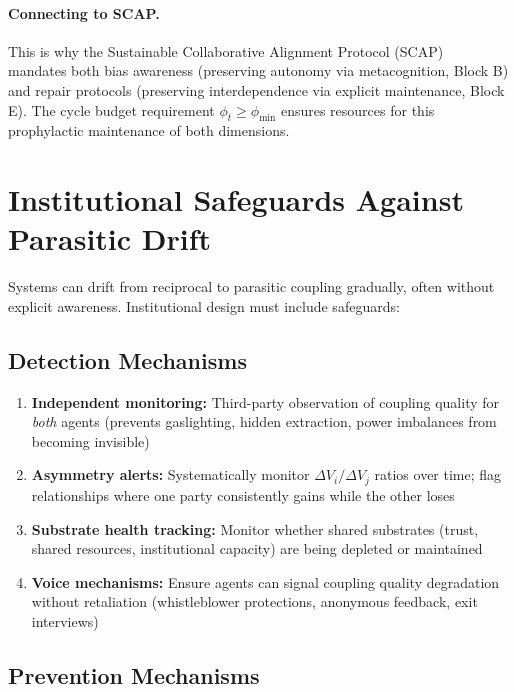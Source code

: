 \documentclass[11pt,a4paper]{article}
\begin{document}
\paragraph{Connecting to SCAP.} This is why the Sustainable Collaborative Alignment Protocol (SCAP)~\cite{scap} mandates both bias awareness (preserving autonomy via metacognition, Block B) and repair protocols (preserving interdependence via explicit maintenance, Block E). The cycle budget requirement $\phi_t \geq \phi_{\min}$ ensures resources for this prophylactic maintenance of both dimensions.

\section{Institutional Safeguards Against Parasitic Drift}

Systems can drift from reciprocal to parasitic coupling gradually, often without explicit awareness. Institutional design must include safeguards:

\subsection{Detection Mechanisms}

\begin{enumerate}
    \item \textbf{Independent monitoring:} Third-party observation of coupling quality for \emph{both} agents (prevents gaslighting, hidden extraction, power imbalances from becoming invisible)
    
    \item \textbf{Asymmetry alerts:} Systematically monitor $\Delta V_i / \Delta V_j$ ratios over time; flag relationships where one party consistently gains while the other loses
    
    \item \textbf{Substrate health tracking:} Monitor whether shared substrates (trust, shared resources, institutional capacity) are being depleted or maintained
    
    \item \textbf{Voice mechanisms:} Ensure agents can signal coupling quality degradation without retaliation (whistleblower protections, anonymous feedback, exit interviews)
\end{enumerate}

\subsection{Prevention Mechanisms}
\end{document}
